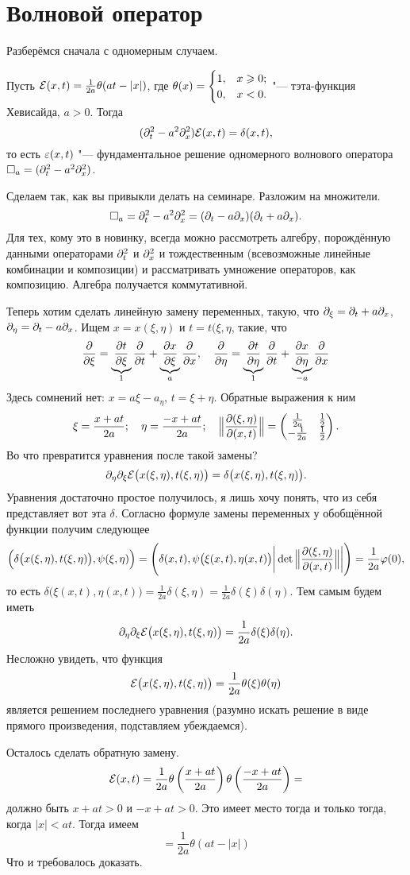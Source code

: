 \section{Волновой оператор}
Разберёмся сначала с одномерным случаем.
\begin{The}
  Пусть $\mathcal E(x,t) = \frac1{2a}\theta(at - |x|)$, где $\theta(x) = \begin{cases}1,&x\geqslant0;\\0,&x<0.\end{cases}$ "--- тэта-функция Хевисайда, $a>0$. Тогда
\[
  (\partial_t^2 - a^2\partial^2_x)\mathcal E(x,t) = \delta(x,t),
\]
то есть $\varepsilon(x,t)$ "--- фундаментальное решение одномерного волнового оператора $\square_a = (\partial_t^2 - a^2\partial^2_x)$.
\end{The}
\begin{Proof}
  Сделаем так, как вы привыкли делать на семинаре. Разложим на множители.
\[
\square_a = \partial_t^2 - a^2\partial^2_x = (\partial_t - a\partial_x)(\partial_t+a\partial_x).
\]
Для тех, кому это в новинку, всегда можно рассмотреть алгебру, порождённую данными операторами $\partial_t^2$ и $\partial_x^2$ и тождественным (всевозможные линейные комбинации и композиции) и рассматривать умножение операторов, как композицию. Алгебра получается коммутативной.

Теперь хотим сделать линейную замену переменных, такую, что $\partial_\xi = \partial_t + a\partial_x$, $\partial_\eta=\partial_t-a\partial_x$. Ищем $x = x(\xi,\eta)$ и $t = t(\xi,\eta$, такие, что
\[
  \frac{\partial }{\partial \xi} = \underbrace{\frac{\partial t}{\partial \xi}}_1\frac{\partial }{\partial t} + \underbrace{\frac{\partial x}{\partial \xi}}_a\frac{\partial }{\partial x},\quad
  \frac{\partial }{\partial \eta} = \underbrace{\frac{\partial t}{\partial \eta}}_1\frac{\partial }{\partial t} + \underbrace{\frac{\partial x}{\partial \eta}}_{-a}\frac{\partial }{\partial x}
\]
Здесь сомнений нет: $x = a\xi - a_\eta$, $t = \xi+\eta$. Обратные выражения к ним
\[
  \xi = \frac{x+at}{2a};\quad \eta = \frac{-x+at}{2a};\quad \Big\|\frac{\partial (\xi,\eta)}{\partial (x,t)}\Big\|=
  \begin{pmatrix}
    \frac1{2a} & \frac12\\
    -\frac1{2a} &\frac12
  \end{pmatrix}.
\]
 Во что превратится уравнения после такой замены?
\[
  \partial_\eta\partial_\xi\mathcal E\big(x(\xi,\eta),t(\xi,\eta)\big) = \delta\big(x(\xi,\eta),t(\xi,\eta)\big).
\]
Уравнения достаточно простое получилось, я лишь хочу понять, что из себя представляет  вот эта $\delta$. Согласно формуле замены переменных у обобщённой функции получим следующее
\[
  \Big(\delta\big(x(\xi,\eta),t(\xi,\eta)\big),\psi(\xi,\eta)\Big) = 
  \Bigg(\delta(x,t),\psi\big(\xi(x,t),\eta(x,t)\big)\bigg|\det\Big\|\frac{\partial (\xi,\eta)}{\partial (x,t)}\Big\|\bigg|\Bigg)=
  \frac1{2a}\varphi(0),
\]
то есть $\delta\big(\xi(x,t),\eta(x,t)\big) = \frac1{2a}\delta(\xi,\eta) = \frac1{2a}\delta(\xi)\delta(\eta)$. Тем самым будем иметь
\[
  \partial_\eta\partial_\xi\mathcal E\big(x(\xi,\eta),t(\xi,\eta)\big) = \frac1{2a}\delta(\xi)\delta(\eta).
\]
Несложно увидеть, что функция
\[
  \mathcal E\big(x(\xi,\eta),t(\xi,\eta)\big) = \frac1{2a}\theta(\xi)\theta(\eta)
\]
является решением последнего уравнения (разумно искать решение в виде прямого произведения, подставляем убеждаемся).

Осталось сделать обратную замену.
\[
  \mathcal E(x,t) = \frac1{2a}\theta\left(\frac{x+at}{2a}\right)\theta\left(\frac{-x+at}{2a}\right) = 
\]
должно быть $x+at >0$ и $-x+at>0$. Это имеет место тогда и только тогда, когда $|x|<at$. Тогда имеем
\[
  = \frac1{2a} \theta(at - |x|)
\]
Что и требовалось доказать.
\end{Proof}


